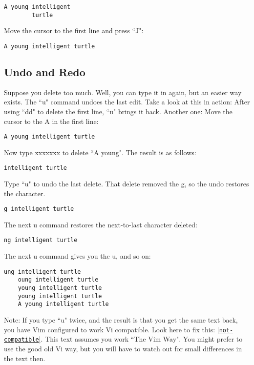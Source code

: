 		\begin{Verbatim}[samepage=true]
		A young intelligent 
		turtle 
		\end{Verbatim}

Move the cursor to the first line and press ``J":

		\begin{Verbatim}[samepage=true]
		A young intelligent turtle 
		\end{Verbatim}

\subsection{Undo and Redo}
\label{Undo and Redo}

Suppose you delete too much.
Well, you can type it in again, but an easier way exists.
The ``u" command undoes the last edit.
Take a look at this in action: After using ``dd" to delete the first line, ``u" brings it back.
Another one: Move the cursor to the A in the first line: 

		\begin{Verbatim}[samepage=true]
		A young intelligent turtle 
						\end{Verbatim}

Now type xxxxxxx to delete ``A young".
The result is as follows: 

	\begin{Verbatim}[samepage=true]
	intelligent turtle 
	\end{Verbatim}

Type ``u" to undo the last delete.
That delete removed the g, so the undo restores the character.

	\begin{Verbatim}[samepage=true]
	g intelligent turtle 
	\end{Verbatim}

The next u command restores the next-to-last character deleted:

	\begin{Verbatim}[samepage=true]
	ng intelligent turtle 
	\end{Verbatim}

The next u command gives you the u, and so on:

	\begin{Verbatim}[samepage=true]
	ung intelligent turtle 
	oung intelligent turtle 
	young intelligent turtle 
	young intelligent turtle 
	A young intelligent turtle 
	\end{Verbatim}

Note:
If you type ``u" twice, and the result is that you get the same text back, you have Vim configured to work Vi compatible.
Look here to fix this: \hyperref[not-compatible]{|\texttt{not-compatible}|}.
This text assumes you work ``The Vim Way".
You might prefer to use the good old Vi way, but you will have to watch out for small differences in the text then.


